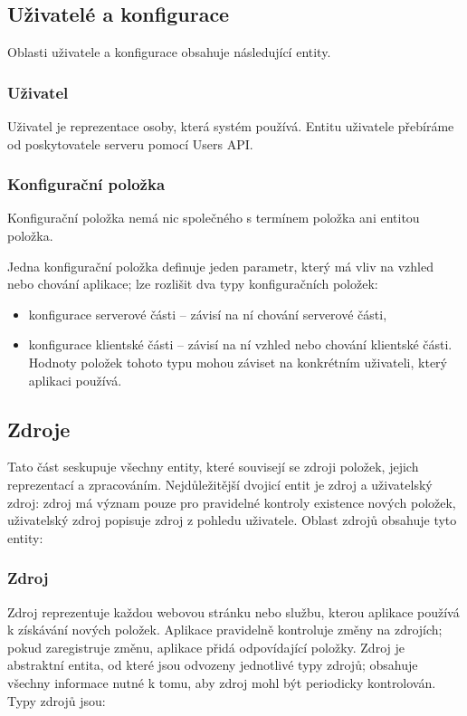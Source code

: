 \subsection{Uživatelé a konfigurace}

Oblasti uživatele a konfigurace obsahuje následující entity.

\subsubsection{Uživatel}

Uživatel je reprezentace osoby, která systém používá.
Entitu uživatele přebíráme od poskytovatele serveru pomocí Users API.

\subsubsection{Konfigurační položka}

Konfigurační položka nemá nic společného s termínem položka ani entitou položka.

Jedna konfigurační položka definuje jeden parametr, který má vliv na vzhled nebo chování aplikace; lze rozlišit dva typy konfiguračních položek:
\begin{itemize}
	\item konfigurace serverové části -- závisí na ní chování serverové části,
	\item konfigurace klientské části -- závisí na ní vzhled nebo chování klientské části.
		Hodnoty položek tohoto typu mohou záviset na konkrétním uživateli, který aplikaci používá.
\end{itemize}

\subsection{Zdroje}

Tato část seskupuje všechny entity, které souvisejí se zdroji položek, jejich reprezentací a zpracováním.
Nejdůležitější dvojicí entit je zdroj a uživatelský zdroj: zdroj má význam pouze pro pravidelné kontroly existence nových položek, uživatelský zdroj popisuje zdroj z pohledu uživatele.
Oblast zdrojů obsahuje tyto entity:

\subsubsection{Zdroj}
\label{sss:zdroj}

Zdroj reprezentuje každou webovou stránku nebo službu, kterou aplikace používá k získávání nových položek.
Aplikace pravidelně kontroluje změny na zdrojích; pokud zaregistruje změnu, aplikace přidá odpovídající položky.
Zdroj je abstraktní entita, od které jsou odvozeny jednotlivé typy zdrojů; obsahuje všechny informace nutné k tomu, aby zdroj mohl být periodicky kontrolován.
Typy zdrojů jsou:

